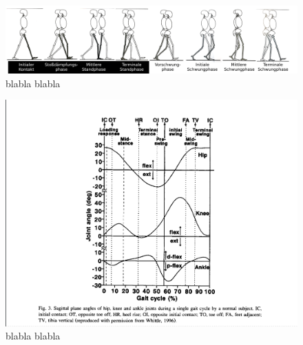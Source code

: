 \begin{figure}
	\centering
	\includegraphics[width=\linewidth]{bilder/Einleitung/Skizze_Gangphasen_small}
	\caption[Gangphasen]{blabla blabla}
	\label{fig:Skizze_Phasen}
\end{figure}

\begin{figure}
	\centering
	\includegraphics[width=0.7\linewidth]{bilder/Einleitung/gangphasen}
	\caption[Gangphasen]{blabla blabla}
	\label{fig:gangphasen}
\end{figure}